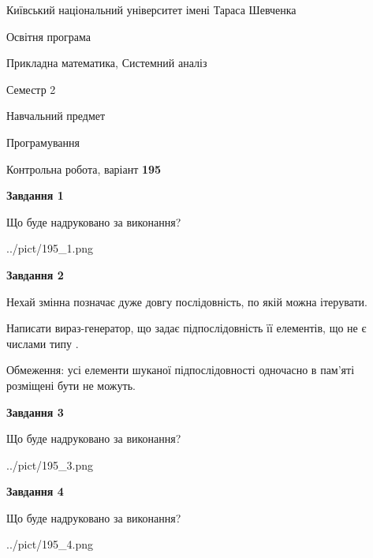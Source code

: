 \documentclass[12pt, ukrainian]{article}
\begin{document}
{{\begin {small}\par
{ \center  Київський національний університет імені Тараса Шевченка \par}
{\parbox {5 cm}{Освітня програма \hfill}{\parbox {8 cm}{Прикладна математика, Системний аналіз \hfill}}\parbox {5 cm}{\hfill Семестр 2}}\par
{\parbox {5 cm} {Навчальний предмет \hfill}\parbox {7 cm}{Програмування \hfill}\parbox {6cm}{\hfill}\par}\vspace{-7pt} \end{small}}{\center Контрольна робота, варіант  \No \textbf
{ 195 }\par}}
{
\begin {large}
{\begin {center}\textbf{Завдання 1}\end {center}}\par
Що буде надруковано за виконання?\par\par
\begin{center}
	{../pict/195_1.png}
\end{center}
\newpage

{\begin {center}\textbf{Завдання 2}\end {center}}\par
Нехай змінна  позначає дуже довгу послідовність, по якій можна ітерувати.

Написати вираз-генератор, що задає підпослідовність її елементів, що не є числами типу .

Обмеження: усі елементи шуканої підпослідовності одночасно в пам'яті розміщені бути не можуть.\par
\newpage

{\begin {center}\textbf{Завдання 3}\end {center}}\par
Що буде надруковано за виконання?\par
\begin{center}
	{../pict/195_3.png}
\end{center}
\newpage

{\begin {center}\textbf{Завдання 4}\end {center}}\par
Що буде надруковано за виконання?\par
\begin{center}
	{../pict/195_4.png}
\end{center}
\newpage


\end{large}}
\end{document}
